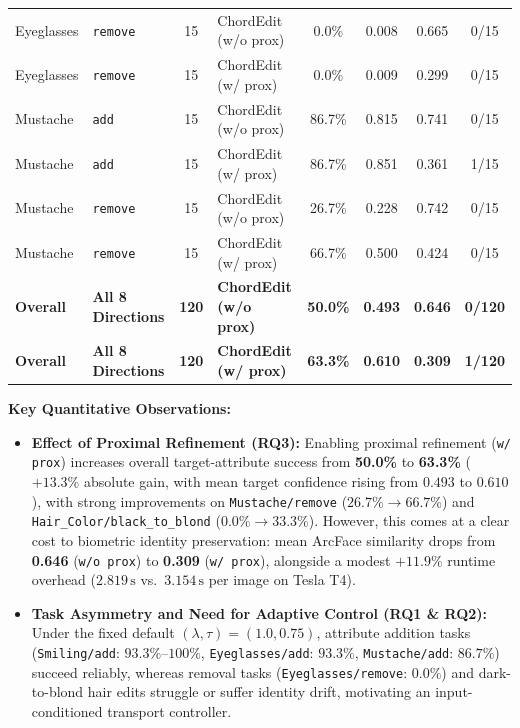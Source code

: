 \documentclass[11pt,a4paper]{article}
\begin{document}
\begin{table}[H]
{\begin{tabular}{llclcccc}
\addlinespace[2pt]
Eyeglasses  & \texttt{remove}           & 15 & ChordEdit (w/o prox) &  0.0\% & 0.008 & 0.665 & 0/15 \\
Eyeglasses  & \texttt{remove}           & 15 & ChordEdit (w/ prox)  &  0.0\% & 0.009 & 0.299 & 0/15 \\
\midrule
Mustache    & \texttt{add}              & 15 & ChordEdit (w/o prox) & 86.7\% & 0.815 & 0.741 & 0/15 \\
Mustache    & \texttt{add}              & 15 & ChordEdit (w/ prox)  & 86.7\% & 0.851 & 0.361 & 1/15 \\
\addlinespace[2pt]
Mustache    & \texttt{remove}           & 15 & ChordEdit (w/o prox) & 26.7\% & 0.228 & 0.742 & 0/15 \\
Mustache    & \texttt{remove}           & 15 & ChordEdit (w/ prox)  & 66.7\% & 0.500 & 0.424 & 0/15 \\
\midrule
\textbf{Overall} & \textbf{All 8 Directions} & \textbf{120} & \textbf{ChordEdit (w/o prox)} & \textbf{50.0\%} & \textbf{0.493} & \textbf{0.646} & \textbf{0/120} \\
\textbf{Overall} & \textbf{All 8 Directions} & \textbf{120} & \textbf{ChordEdit (w/ prox)}  & \textbf{63.3\%} & \textbf{0.610} & \textbf{0.309} & \textbf{1/120} \\
\bottomrule
\end{tabular}%
}
\end{table}

\textbf{Key Quantitative Observations:}
\begin{itemize}
    \item \textbf{Effect of Proximal Refinement (RQ3):} Enabling proximal refinement (\texttt{w/ prox}) increases overall target-attribute success from \textbf{50.0\%} to \textbf{63.3\%} ($+13.3\%$ absolute gain, with mean target confidence rising from $0.493$ to $0.610$), with strong improvements on \texttt{Mustache/remove} ($26.7\% \to 66.7\%$) and \texttt{Hair\_Color/black\_to\_blond} ($0.0\% \to 33.3\%$). However, this comes at a clear cost to biometric identity preservation: mean ArcFace similarity drops from \textbf{0.646} (\texttt{w/o prox}) to \textbf{0.309} (\texttt{w/ prox}), alongside a modest $+11.9\%$ runtime overhead ($2.819\,\text{s}$ vs.\ $3.154\,\text{s}$ per image on Tesla T4).
    \item \textbf{Task Asymmetry and Need for Adaptive Control (RQ1 \& RQ2):} Under the fixed default $(\lambda, \tau) = (1.0, 0.75)$, attribute addition tasks (\texttt{Smiling/add}: $93.3\%\text{--}100\%$, \texttt{Eyeglasses/add}: $93.3\%$, \texttt{Mustache/add}: $86.7\%$) succeed reliably, whereas removal tasks (\texttt{Eyeglasses/remove}: $0.0\%$) and dark-to-blond hair edits struggle or suffer identity drift, motivating an input-conditioned transport controller.
\end{itemize}
\end{document}
